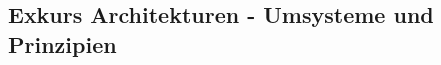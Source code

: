 
\clearpage
\begin{flushleft}
    \section{Exkurs Architekturen - Umsysteme und Prinzipien}
    
    
\end{flushleft}